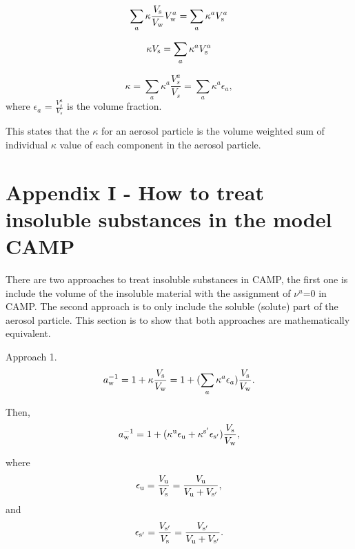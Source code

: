 \documentclass[12pt]{article}
\begin{document}
\begin{equation}\label{eqn:6.15}
\sum_{a} \kappa \frac{V_{\rm s}}{V_{\rm w}} V_{\rm w}^{a}= \sum_{a} \kappa^{a} V_{\rm s}^{a}
\end{equation}

\begin{equation}\label{eqn:6.16}
\kappa V_{\rm s}= \sum_{a} \kappa^{a} V_{\rm s}^{a}
\end{equation}

\begin{equation}\label{eqn:6.17}
\kappa= \sum_{a} \kappa^{a} \frac {V_{s}^{a}}{V_{s}} = \sum_{a} \kappa^{a} \epsilon_{a},
\end{equation}
where $\epsilon_{a}$ = $ \frac{V_{s}^{a}}{V_{s}}$ is the volume fraction.

This states that the $\kappa$ for an aerosol particle is the volume weighted sum of individual $\kappa$ value of each component in the aerosol particle.  

\section{Appendix I - How to treat insoluble substances in the model CAMP}

There are two approaches to treat insoluble substances in CAMP, the first one is include the volume of the insoluble material with the assignment of $\nu^{u}$=$0$ in CAMP. The second approach is to only include the soluble (solute) part of the aerosol particle. This section is to show that both approaches are mathematically equivalent.
 
Approach 1. 
\begin{equation}\label{eqn:A1}
a_{\rm w}^{-1}=1+\kappa \frac{V_{\rm s}}{V_{\rm w}}=1+ (\sum_{a} \kappa^{a} \epsilon_{a})\frac{V_{\rm s}}{V_{\rm w}}.
\end{equation}

Then,
\begin{equation}\label{eqn:A2}
a_{\rm w}^{-1}=1+ (\kappa^{\rm u} \epsilon_{\rm u} +\kappa^{\rm s'} \epsilon_{\rm s'}) \frac{V_{\rm s}}{V_{\rm w}},
\end{equation}

where
\begin{equation}\label{eqn:A3}
\epsilon_{\rm u}=\frac{V_{\rm u}}{V_{\rm s}}=\frac{V_{\rm u}}{V_{\rm u}+V_{\rm s'}},
\end{equation}
and
\begin{equation}\label{eqn:A4}
\epsilon_{\rm s'}=\frac{V_{\rm s'}}{V_{\rm s}}=\frac{V_{\rm s'}}{V_{\rm u}+V_{\rm s'}}.
\end{equation}
\end{document}
